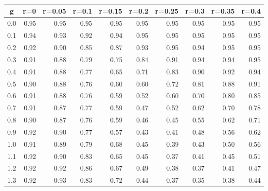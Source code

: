 %
\begin{table}[!tbp]
 \begin{center}
 \begin{tabular}{rrrrrrrrrr}\hline\hline
\multicolumn{1}{c}{g}&\multicolumn{1}{c}{r=0}&\multicolumn{1}{c}{r=0.05}&\multicolumn{1}{c}{r=0.1}&\multicolumn{1}{c}{r=0.15}&\multicolumn{1}{c}{r=0.2}&\multicolumn{1}{c}{r=0.25}&\multicolumn{1}{c}{r=0.3}&\multicolumn{1}{c}{r=0.35}&\multicolumn{1}{c}{r=0.4}\tabularnewline
\hline
0.0&0.95&0.95&0.95&0.95&0.95&0.95&0.95&0.95&0.95\tabularnewline
0.1&0.94&0.93&0.92&0.94&0.95&0.95&0.95&0.95&0.95\tabularnewline
0.2&0.92&0.90&0.85&0.87&0.93&0.95&0.94&0.95&0.95\tabularnewline
0.3&0.91&0.88&0.79&0.75&0.84&0.91&0.94&0.94&0.95\tabularnewline
0.4&0.91&0.88&0.77&0.65&0.71&0.83&0.90&0.92&0.94\tabularnewline
0.5&0.90&0.88&0.76&0.60&0.60&0.72&0.81&0.88&0.91\tabularnewline
0.6&0.91&0.88&0.76&0.59&0.52&0.60&0.70&0.80&0.85\tabularnewline
0.7&0.91&0.87&0.77&0.59&0.47&0.52&0.62&0.70&0.78\tabularnewline
0.8&0.90&0.87&0.76&0.59&0.46&0.45&0.55&0.62&0.71\tabularnewline
0.9&0.92&0.90&0.77&0.57&0.43&0.41&0.48&0.56&0.62\tabularnewline
1.0&0.91&0.89&0.79&0.68&0.45&0.39&0.43&0.50&0.56\tabularnewline
1.1&0.92&0.90&0.83&0.65&0.45&0.37&0.41&0.45&0.51\tabularnewline
1.2&0.92&0.92&0.86&0.67&0.49&0.38&0.37&0.41&0.47\tabularnewline
1.3&0.92&0.93&0.83&0.72&0.44&0.37&0.35&0.38&0.44\tabularnewline
\hline
\end{tabular}

\end{center}

\end{table}

